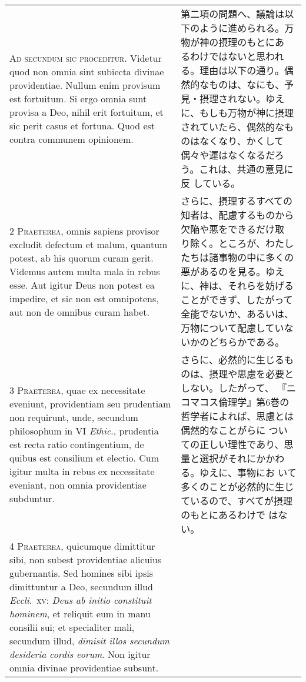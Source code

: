 \documentclass[10pt]{jsarticle} %
\begin{document}
\begin{longtable}{p{21em}p{21em}}

{\Huge A}{\scshape d secundum sic proceditur}. Videtur quod
non omnia sint subiecta divinae providentiae. Nullum enim provisum est
fortuitum. Si ergo omnia sunt provisa a Deo, nihil erit fortuitum, et
sic perit casus et fortuna. Quod est contra communem opinionem.

&


第二項の問題へ、議論は以下のように進められる。万物が神の摂理のもとにあ
るわけではないと思われる。理由は以下の通り。偶然的なものは、なにも、予
見・摂理されない。ゆえに、もしも万物が神に摂理されていたら、偶然的なも
のはなくなり、かくして偶々や運はなくなるだろう。これは、共通の意見に反
している。

\\


{\scshape 2 Praeterea}, omnis sapiens provisor excludit
defectum et malum, quantum potest, ab his quorum curam gerit. Videmus
autem multa mala in rebus esse. Aut igitur Deus non potest ea impedire,
et sic non est omnipotens, aut non de omnibus curam habet.

&


さらに、摂理するすべての知者は、配慮するものから欠陥や悪をできるだけ取
り除く。ところが、わたしたちは諸事物の中に多くの悪があるのを見る。ゆえ
に、神は、それらを妨げることができず、したがって全能でないか、あるいは、
万物について配慮していないかのどちらかである。

\\


{\scshape 3 Praeterea}, quae ex necessitate eveniunt,
providentiam seu prudentiam non requirunt, unde, secundum philosophum in
VI {\itshape Ethic}., prudentia est recta ratio contingentium, de quibus est
consilium et electio. Cum igitur multa in rebus ex necessitate eveniant,
non omnia providentiae subduntur.

&


さらに、必然的に生じるものは、摂理や思慮を必要としない。したがって、
『ニコマコス倫理学』第6巻の哲学者によれば、思慮とは偶然的なことがらに
ついての正しい理性であり、思量と選択がそれにかかわる。ゆえに、事物にお
いて多くのことが必然的に生じているので、すべてが摂理のもとにあるわけで
はない。

\\


{\scshape 4 Praeterea}, quicumque dimittitur sibi, non
subest providentiae alicuius gubernantis. Sed homines sibi ipsis
dimittuntur a Deo, secundum illud {\itshape Eccli}.~{\scshape xv}: {\itshape Deus ab initio constituit
hominem}, et reliquit eum in manu consilii sui; et specialiter mali,
secundum illud, {\itshape dimisit illos secundum desideria cordis eorum}. Non
igitur omnia divinae providentiae subsunt.


\end{longtable}
\end{document}
